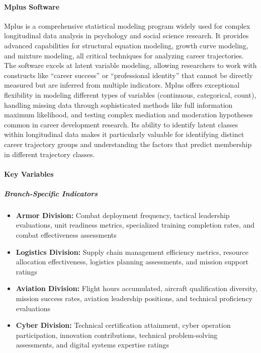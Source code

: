 \documentclass[../main.tex]{subfiles}
\begin{document}
\paragraph{Mplus Software}
Mplus is a comprehensive statistical modeling program widely used for complex longitudinal data analysis in psychology and social science research. It provides advanced capabilities for structural equation modeling, growth curve modeling, and mixture modeling, all critical techniques for analyzing career trajectories. The software excels at latent variable modeling, allowing researchers to work with constructs like ``career success'' or ``professional identity'' that cannot be directly measured but are inferred from multiple indicators. Mplus offers exceptional flexibility in modeling different types of variables (continuous, categorical, count), handling missing data through sophisticated methods like full information maximum likelihood, and testing complex mediation and moderation hypotheses common in career development research. Its ability to identify latent classes within longitudinal data makes it particularly valuable for identifying distinct career trajectory groups and understanding the factors that predict membership in different trajectory classes.


\paragraph{Key Variables}

\subparagraph{Branch-Specific Indicators}
\begin{itemize}
\item \textbf{Armor Division:} Combat deployment frequency, tactical leadership evaluations, unit readiness metrics, specialized training completion rates, and combat effectiveness assessments
\item \textbf{Logistics Division:} Supply chain management efficiency metrics, resource allocation effectiveness, logistics planning assessments, and mission support ratings
\item \textbf{Aviation Division:} Flight hours accumulated, aircraft qualification diversity, mission success rates, aviation leadership positions, and technical proficiency evaluations
\item \textbf{Cyber Division:} Technical certification attainment, cyber operation participation, innovation contributions, technical problem-solving assessments, and digital systems expertise ratings
\end{itemize}
\end{document}
